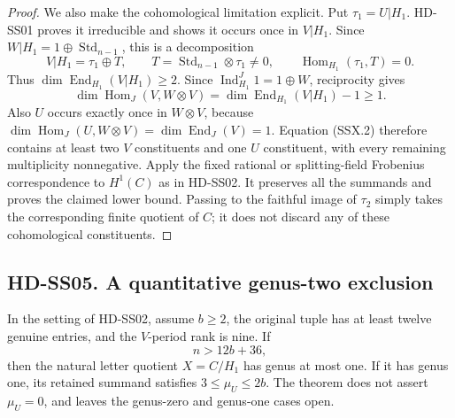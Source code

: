 \begin{proof}
We also make the cohomological limitation explicit.  Put
$\tau_1=U|H_1$.  HD-SS01 proves it irreducible and shows it
occurs once in $V|H_1$.  Since
$W|H_1=1\oplus\operatorname{Std}_{n-1}$, this is a decomposition
\[
 V|H_1=\tau_1\oplus T,
 \qquad T=\operatorname{Std}_{n-1}\otimes\tau_1\ne0,
 \qquad\operatorname{Hom}_{H_1}(\tau_1,T)=0.
 \tag{SSX.7}
\]
Thus $\dim\operatorname{End}_{H_1}(V|H_1)\ge2$.
Since $\operatorname{Ind}_{H_1}^J1=1\oplus W$, reciprocity gives
\[
  \dim\operatorname{Hom}_J(V,W\otimes V)
   =\dim\operatorname{End}_{H_1}(V|H_1)-1\ge1.
 \tag{SSX.8}
\]
Also $U$ occurs exactly once in $W\otimes V$, because
$\dim\operatorname{Hom}_J(U,W\otimes V)
=\dim\operatorname{End}_J(V)=1$.
Equation (SSX.2) therefore contains at least two $V$ constituents
and one $U$ constituent, with every remaining multiplicity
nonnegative.  Apply the fixed rational or splitting-field
Frobenius correspondence to $H^1(C)$ as in HD-SS02.
It preserves all the summands and proves the claimed lower bound.
Passing to the faithful image of $\tau_2$ simply takes the
corresponding finite quotient of $C$; it does not discard any
of these cohomological constituents.
\end{proof}

\subsection*{HD-SS05. A quantitative genus-two exclusion}

\begin{theorem}[HD-SS05]
In the setting of HD-SS02, assume $b\ge2$, the original tuple
has at least twelve genuine entries, and the $V$-period rank is
nine.  If
\[
                              n>12b+36,
 \tag{SSX.9}
\]
then the natural letter quotient $X=C/H_1$ has genus at most one.
If it has genus one, its retained summand satisfies
$3\le\mu_U\le2b$.
The theorem does not assert $\mu_U=0$, and leaves the genus-zero
and genus-one cases open.
\end{theorem}

